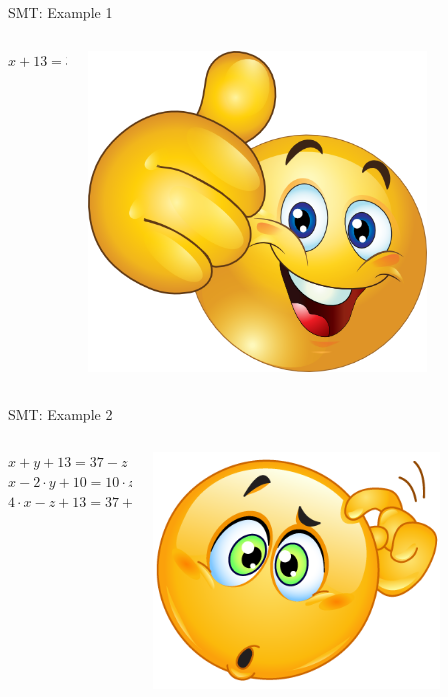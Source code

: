 \documentclass[10pt, compress, aspectratio=169]{beamer}
\begin{document}
\begin{frame}{SMT: Example 1}

	\begin{columns}
		\begin{column}{0.5\textwidth}
			\huge{$ x+13=37 $}
		\end{column}
		\begin{column}{0.5\textwidth}
			\includegraphics[width=0.8\textwidth]{images/happy.png}
		\end{column}
	\end{columns}
 
\end{frame}

\begin{frame}{SMT: Example 2}

	\begin{columns}
		\begin{column}{0.6\textwidth}
			\huge{$ x+y+13=37-z $} \\
			\huge{$ x-2 \cdot y+10=10 \cdot z $} \\
			\huge{$ 4\cdot x-z+13=37+y $} \\
		\end{column}
		\begin{column}{0.4\textwidth}
			\includegraphics[width=0.8\textwidth]{images/thinking.png}
		\end{column}
	\end{columns} 
	
\end{frame}
\end{document}

